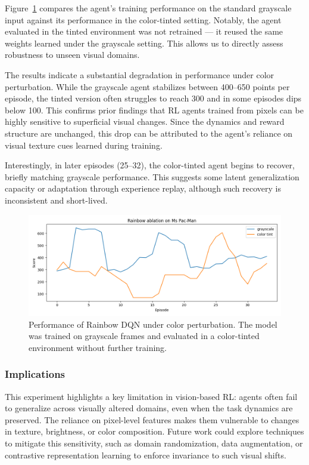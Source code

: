 \documentclass{article}
\begin{document}
Figure~\ref{fig:color_robustness} compares the agent’s training performance on the standard grayscale input against its performance in the color-tinted setting. Notably, the agent evaluated in the tinted environment was not retrained — it reused the same weights learned under the grayscale setting. This allows us to directly assess robustness to unseen visual domains.

The results indicate a substantial degradation in performance under color perturbation. While the grayscale agent stabilizes between 400–650 points per episode, the tinted version often struggles to reach 300 and in some episodes dips below 100. This confirms prior findings \cite{zhang2020investigation} that RL agents trained from pixels can be highly sensitive to superficial visual changes. Since the dynamics and reward structure are unchanged, this drop can be attributed to the agent’s reliance on visual texture cues learned during training.

Interestingly, in later episodes (25–32), the color-tinted agent begins to recover, briefly matching grayscale performance. This suggests some latent generalization capacity or adaptation through experience replay, although such recovery is inconsistent and short-lived.

\begin{figure}[h]
    \centering
    \includegraphics[width=\linewidth]{color_robustness.png}
    \caption{Performance of Rainbow DQN under color perturbation. The model was trained on grayscale frames and evaluated in a color-tinted environment without further training.}
    \label{fig:color_robustness}
\end{figure}

\subsubsection*{Implications}

This experiment highlights a key limitation in vision-based RL: agents often fail to generalize across visually altered domains, even when the task dynamics are preserved. The reliance on pixel-level features makes them vulnerable to changes in texture, brightness, or color composition. Future work could explore techniques to mitigate this sensitivity, such as domain randomization, data augmentation, or contrastive representation learning to enforce invariance to such visual shifts.



\end{document}
